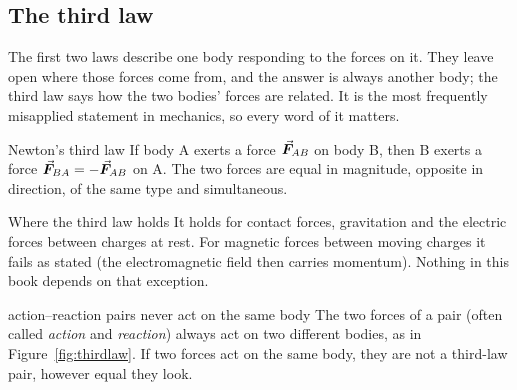
\subsection{The third law}

The first two laws describe one body responding to the forces on it. They leave open where those forces
come from, and the answer is always another body; the third law says how the two bodies' forces are
related. It is the most frequently misapplied statement in mechanics, so every word of it matters.

\begin{keybox}{Newton's third law}
If body A exerts a force $\vec{\bm{F}}_{AB}$ on body B, then B exerts a force $\vec{\bm{F}}_{BA}=-\vec{\bm{F}}_{AB}$ on A. The two
forces are equal in magnitude, opposite in direction, of the same type and simultaneous.
\end{keybox}

\begin{remarkbox}{Where the third law holds}
It holds for contact forces, gravitation and the electric forces between charges at rest. For magnetic
forces between moving charges it fails as stated (the electromagnetic field then carries momentum).
Nothing in this book depends on that exception.
\end{remarkbox}

\begin{figure}[htbp]
\centering
{}
\end{figure}

\begin{trapbox}{action--reaction pairs never act on the same body}
The two forces of a pair (often called \emph{action} and \emph{reaction}) always act on two different
bodies, as in Figure~\ref{fig:thirdlaw}. If two forces act on the same body, they are not a third-law
pair, however equal they look.
\end{trapbox}

